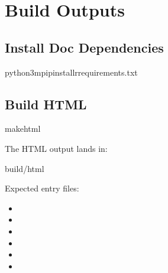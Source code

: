 \documentclass[letterpaper,10pt,english]{sphinxmanual}
\begin{document}
\sphinxstepscope


\chapter{Build Outputs}
\label{\detokenize{build_outputs:build-outputs}}\label{\detokenize{build_outputs::doc}}

\section{Install Doc Dependencies}
\label{\detokenize{build_outputs:install-doc-dependencies}}
\begin{sphinxVerbatim}[commandchars=\\\{\}]
python3\PYGZhy{}mpipinstall\PYGZhy{}rrequirements.txt
\end{sphinxVerbatim}


\section{Build HTML}
\label{\detokenize{build_outputs:build-html}}
\begin{sphinxVerbatim}[commandchars=\\\{\}]
makehtml
\end{sphinxVerbatim}

\sphinxAtStartPar
The HTML output lands in:

\begin{sphinxVerbatim}[commandchars=\\\{\}]
\PYGZus{}build/html
\end{sphinxVerbatim}

\sphinxAtStartPar
Expected entry files:
\begin{itemize}
\item {} 
\sphinxAtStartPar
{}

\item {} 
\sphinxAtStartPar
{}

\item {} 
\sphinxAtStartPar
{}

\item {} 
\sphinxAtStartPar
{}

\item {} 
\sphinxAtStartPar
{}

\item {} 
\sphinxAtStartPar
{}

\end{itemize}
\end{document}

